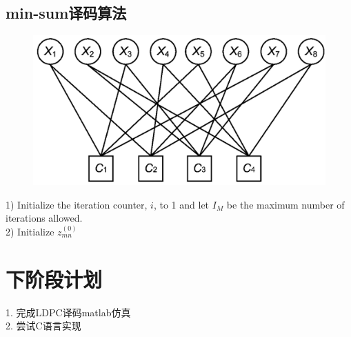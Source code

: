 \documentclass{article}
\begin{document}
\subsection{min-sum译码算法}
\begin{figure}[H]
	\centering
	\includegraphics[width = .4\textwidth]{Tanner.png}
\end{figure}


1) Initialize the iteration counter, $i$, to 1 and let $I_M$ be the maximum number of 
iterations allowed.\\
2) Initialize $z^{(0)}_{mn}$





\section{下阶段计划}
1. 完成LDPC译码matlab仿真\\
2. 尝试C语言实现
\end{document}
